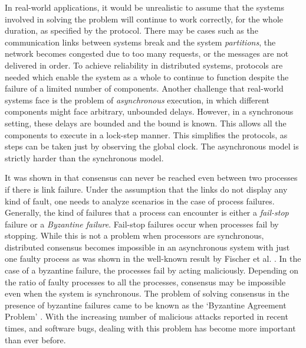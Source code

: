 In real-world applications, it would be unrealistic to assume that the systems involved in solving the problem will continue to work correctly, for the whole duration, as specified by the protocol. There may be cases such as the communication links between systems break and the system \textit{partitions}, the network becomes congested due to too many requests, or the messages are not delivered in order. To achieve reliability in distributed systems, protocols are needed which enable the system as a whole to continue to function despite the failure of a limited number of components. Another challenge that real-world systems face is the problem of \textit{asynchronous} execution, in which different components might face arbitrary, unbounded delays. However, in a synchronous setting, these delays are bounded and the bound is known. This allows all the components to execute in a lock-step manner. This simplifies the protocols, as steps can be taken just by observing the global clock. The asynchronous model is strictly harder than the synchronous model. 

It was shown in \cite{LamportSP82} that consensus can never be reached even between two processes if there is link failure. Under the assumption that the links do not display any kind of fault, one needs to analyze scenarios in the case of process failures. Generally, the kind of failures that a process can encounter is either a \textit{fail-stop} failure or a \textit{Byzantine failure}. Fail-stop failures occur when processes fail by stopping. While this is not a problem when processors are synchronous, distributed consensus becomes impossible in an asynchronous system with just one faulty process as was shown in the well-known result by Fischer et al. \cite{FischerLP83}. In the case of a byzantine failure, the processes fail by acting maliciously. Depending on the ratio of faulty processes to all the processes, consensus may be impossible even when the system is synchronous. The problem of solving consensus in the presence of byzantine failures came to be known as the `Byzantine Agreement Problem' \cite{LamportSP82}. With the increasing number of malicious attacks reported in recent times, and software bugs, dealing with this problem has become more important than ever before.

